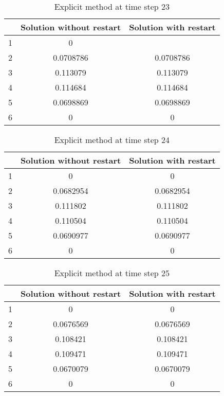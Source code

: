 \documentclass[a4paper,12pt]{article}
\begin{document}
\begin{table}[H]
\begin{center}
\begin{tabular}{ | c | c | c | }
  \hline
  & Solution without restart & Solution with restart \\
 \hline
 1  &  0 &    \\
  \hline
 2  &  0.0708786 & 0.0708786    \\
  \hline
 3  &  0.113079 &  0.113079  \\
  \hline
 4  &  0.114684 & 0.114684   \\
  \hline
 5  &   0.0698869 & 0.0698869   \\
  \hline
 6  &   0 &  0  \\
  \hline
\end{tabular}
\end{center}
\caption{Explicit method at time step 23}
\end{table}

\begin{table}[H]
\begin{center}
\begin{tabular}{ | c | c | c | }
  \hline
  & Solution without restart & Solution with restart \\
 \hline
 1  &  0 & 0   \\
  \hline
 2  &  0.0682954 & 0.0682954   \\
  \hline
 3  &  0.111802  & 0.111802   \\
  \hline
 4  &  0.110504 &  0.110504  \\
  \hline
 5  &  0.0690977 & 0.0690977   \\
  \hline
 6  &   0 &  0  \\
  \hline
\end{tabular}
\end{center}
\caption{Explicit method at time step 24}
\end{table}

\begin{table}[H]
\begin{center}
\begin{tabular}{ | c | c | c | }
  \hline
  & Solution without restart & Solution with restart \\
 \hline
 1  &  0 &  0  \\
  \hline
 2  &  0.0676569 & 0.0676569   \\
  \hline
 3  &  0.108421 & 0.108421   \\
  \hline
 4  &  0.109471 & 0.109471   \\
  \hline
 5  & 0.0670079 & 0.0670079   \\
  \hline
 6  &   0 &  0  \\
  \hline
\end{tabular}
\end{center}
\caption{Explicit method at time step 25}
\end{table}
\end{document}
